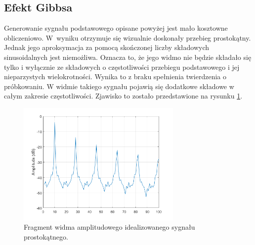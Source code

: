 \subsection{Efekt Gibbsa}\label{sec:gibbs}
Generowanie sygnału podstawowego opisane powyżej jest mało kosztowne obliczeniowo. W~wyniku otrzymuje się wizualnie doskonały przebieg prostokątny. Jednak jego aproksymacja za pomocą skończonej liczby składowych sinusoidalnych jest niemożliwa. Oznacza to, że jego widmo nie będzie składało się tylko i wyłącznie ze składowych o częstotliwości przebiegu podstawowego i jej nieparzystych wielokrotności. Wynika to z braku spełnienia twierdzenia o próbkowaniu. 
W widmie takiego sygnału pojawią się dodatkowe składowe w całym zakresie częstotliwości. Zjawisko to zostało przedstawione na rysunku \ref{rys:sub_gibbs1}.
\begin{figure}[H]
	\centering
	\includegraphics[width=8cm]{grafiki/sub_gibbs1}
	\captionsetup{justification=centering}
	\caption{Fragment widma amplitudowego idealizowanego sygnału prostokątnego.}
	\label{rys:sub_gibbs1}
\end{figure}

